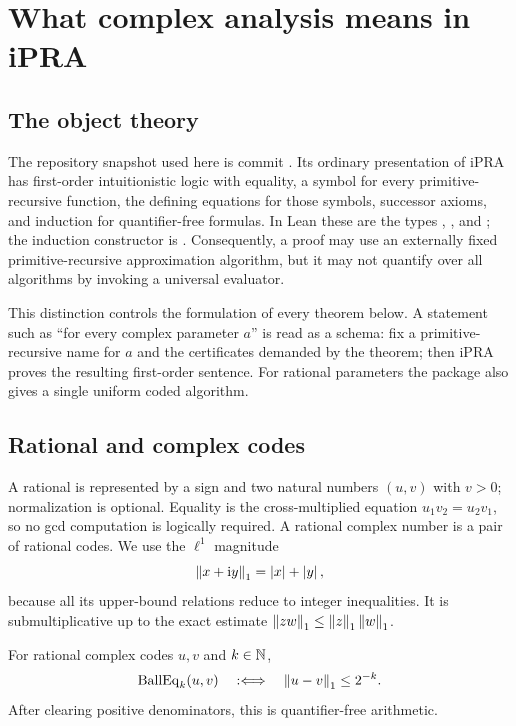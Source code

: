 \section{What complex analysis means in iPRA}\label{sec:ipra}

\subsection{The object theory}

The repository snapshot used here is commit
.  Its ordinary presentation of
iPRA has first-order intuitionistic logic with equality, a symbol for every
primitive-recursive function, the defining equations for those symbols,
successor axioms, and induction for quantifier-free formulas.  In Lean these
are the types , , and ; the induction constructor
is .  Consequently, a proof may use an externally fixed
primitive-recursive approximation algorithm, but it may not quantify over all
algorithms by invoking a universal evaluator.

This distinction controls the formulation of every theorem below.  A statement
such as ``for every complex parameter $a$'' is read as a schema: fix a
primitive-recursive name for $a$ and the certificates demanded by the theorem;
then iPRA proves the resulting first-order sentence.  For rational parameters
the package also gives a single uniform coded algorithm.

\subsection{Rational and complex codes}

A rational is represented by a sign and two natural numbers $(u,v)$ with
$v>0$; normalization is optional.  Equality is the cross-multiplied equation
$u_1v_2=u_2v_1$, so no gcd computation is logically required.  A rational
complex number is a pair of rational codes.  We use the $\ell^1$ magnitude
\[
 \left\lVert x+\mathrm i y\right\rVert_1=\left|x\right|+\left|y\right|,
\]
because all its upper-bound relations reduce to integer inequalities.  It is
submultiplicative up to the exact estimate
$\left\lVert zw\right\rVert_1\le\left\lVert z\right\rVert_1\left\lVert w\right\rVert_1$.

\begin{definition}
For rational complex codes $u,v$ and $k\in\mathbb N$,
\[
 \operatorname{BallEq}_k(u,v)\quad:\Longleftrightarrow\quad
 \left\lVert u-v\right\rVert_1\le 2^{-k}.
\]
After clearing positive denominators, this is quantifier-free arithmetic.
\end{definition}


